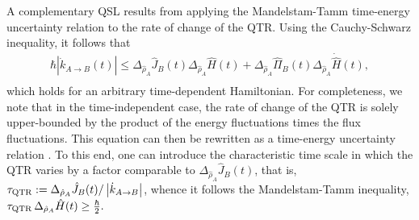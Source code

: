 \documentclass[prl,aps,amssymb,twocolumn,superscriptaddress, notitlepage, longbibliography]{revtex4-2}
\begin{document}
A complementary QSL results from applying the Mandelstam-Tamm time-energy uncertainty relation to the rate of change of the QTR.
Using the Cauchy-Schwarz inequality, it follows that
\begin{eqnarray}\hbar\left|\dot{k}_{A\rightarrow B}(t)\right|\le
\Delta_{\hat\rho_A}\hat J_B(t)\Delta_{\hat\rho_A}\hat H(t)+\Delta_{\hat\rho_A}\hat\Pi_B(t)\Delta_{\hat\rho_A}\dot{\hat H}(t),\nonumber\\
\end{eqnarray}
which holds for an arbitrary time-dependent Hamiltonian.
For completeness, we note that in the time-independent case, the rate of change of the QTR is solely upper-bounded by the product of the energy fluctuations times the flux fluctuations.
This equation can then be rewritten as a time-energy uncertainty relation \cite{Mandelstam45}. To this end, one can introduce the characteristic time scale in which the QTR varies by a factor comparable to $\Delta_{\hat{\rho}_A}\hat J_B(t)$, that is,
$\tau_{\rm QTR}:=\Delta_{\hat{\rho}_A}\hat J_B(t)/\left|\dot{k}_{A\rightarrow B}\right|$,
whence it follows the Mandelstam-Tamm inequality,
    $\tau_{\rm QTR}\,\Delta_{\hat{\rho}_A} \hat H(t)\geq\frac{\hbar}{2}.$
\end{document}

